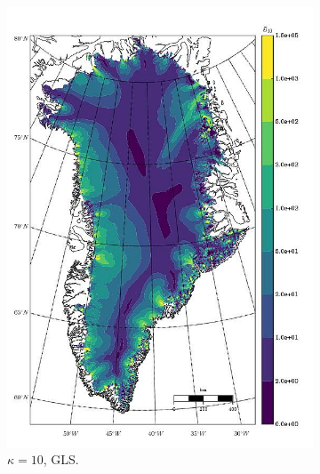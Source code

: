 \begin{figure}
  \begin{subfigure}[b]{0.25\linewidth}
    \includegraphics[width=\linewidth]{images/balance_velocity/greenland/Ubar_5H_kappa_10_GLS.jpg}
  \caption{$\kappa = 10$, GLS.}
  \label{greenland_bv_image_kappa_10_GLS}
  \end{subfigure}
  \begin{subfigure}[b]{0.25\linewidth}

\end{subfigure}
\end{figure}
